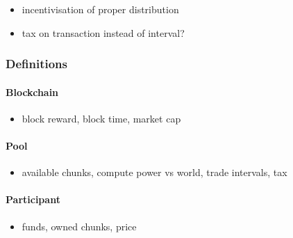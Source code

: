 \begin{itemize}
  \item incentivisation of proper distribution
  \item tax on transaction instead of interval?
\end{itemize}

\subsubsection{Definitions}

\paragraph{Blockchain}

\begin{itemize}
  \item block reward, block time, market cap
\end{itemize}

\paragraph{Pool}

\begin{itemize}
  \item available chunks, compute power vs world, trade intervals, tax
\end{itemize}

\paragraph{Participant}

\begin{itemize}
  \item funds, owned chunks, price
\end{itemize}
